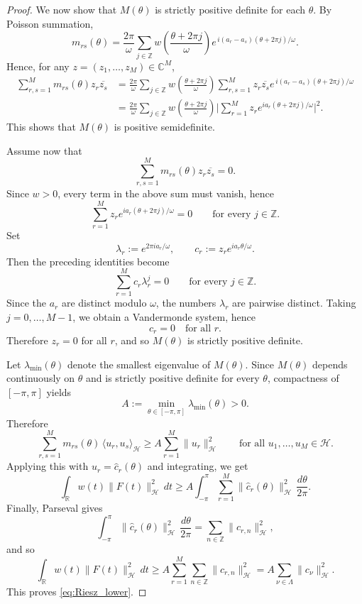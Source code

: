\documentclass[10pt,a4paper]{amsart}
\begin{document}
\begin{proof}
We now show that $M(\theta)$ is strictly positive definite for each $\theta$.
By Poisson summation,
\[
m_{rs}(\theta)
=
\frac{2\pi}{\omega}\sum_{j\in\mathbb Z}
w\!\left(\frac{\theta+2\pi j}{\omega}\right)
e^{\,i(a_r-a_s)(\theta+2\pi j)/\omega}.
\]
Hence, for any $z=(z_1,\dots,z_M)\in\mathbb C^M$,
\begin{align*}
\sum_{r,s=1}^M m_{rs}(\theta) z_r\overline{z_s}
&=
\frac{2\pi}{\omega}\sum_{j\in\mathbb Z}
w\!\left(\frac{\theta+2\pi j}{\omega}\right)
\sum_{r,s=1}^M
z_r\overline{z_s}
e^{\,i(a_r-a_s)(\theta+2\pi j)/\omega} \\
&=
\frac{2\pi}{\omega}\sum_{j\in\mathbb Z}
w\!\left(\frac{\theta+2\pi j}{\omega}\right)
\Big|\sum_{r=1}^M z_r e^{ia_r(\theta+2\pi j)/\omega}\Big|^2.
\end{align*}
This shows that $M(\theta)$ is positive semidefinite.

Assume now that
\[
\sum_{r,s=1}^M m_{rs}(\theta) z_r\overline{z_s}=0.
\]
Since $w>0$, every term in the above sum must vanish, hence
\[
\sum_{r=1}^M z_r e^{ia_r(\theta+2\pi j)/\omega}=0
\qquad\text{for every }j\in\mathbb Z.
\]
Set
\[
\lambda_r:=e^{2\pi i a_r/\omega},
\qquad
c_r:=z_r e^{ia_r\theta/\omega}.
\]
Then the preceding identities become
\[
\sum_{r=1}^M c_r \lambda_r^j = 0
\qquad\text{for every }j\in\mathbb Z.
\]
Since the $a_r$ are distinct modulo $\omega$, the numbers $\lambda_r$ are pairwise distinct. Taking $j=0,\dots,M-1$, we obtain a Vandermonde system, hence
\[
c_r=0 \quad\text{for all }r.
\]
Therefore $z_r=0$ for all $r$, and so $M(\theta)$ is strictly positive definite.

Let $\lambda_{\min}(\theta)$ denote the smallest eigenvalue of $M(\theta)$. Since $M(\theta)$ depends continuously on $\theta$ and is strictly positive definite for every $\theta$, compactness of $[-\pi,\pi]$ yields
\[
A:=\min_{\theta\in[-\pi,\pi]} \lambda_{\min}(\theta)>0.
\]
Therefore
\[
\sum_{r,s=1}^M
m_{rs}(\theta)\,
\langle u_r,u_s\rangle_{\mathcal H}
\ge
A\sum_{r=1}^M \|u_r\|_{\mathcal H}^2
\qquad
\text{for all }u_1,\dots,u_M\in\mathcal H.
\]
Applying this with $u_r=\widehat c_r(\theta)$ and integrating, we get
\[
\int_{\mathbb R} w(t)\|F(t)\|_{\mathcal H}^2\,dt
\ge
A\int_{-\pi}^{\pi}\sum_{r=1}^M \|\widehat c_r(\theta)\|_{\mathcal H}^2\,\frac{d\theta}{2\pi}.
\]
Finally, Parseval gives
\[
\int_{-\pi}^{\pi}\|\widehat c_r(\theta)\|_{\mathcal H}^2\,\frac{d\theta}{2\pi}
=
\sum_{n\in\mathbb Z}\|c_{r,n}\|_{\mathcal H}^2,
\]
and so
\[
\int_{\mathbb R} w(t)\|F(t)\|_{\mathcal H}^2\,dt
\ge
A\sum_{r=1}^M\sum_{n\in\mathbb Z}\|c_{r,n}\|_{\mathcal H}^2
=
A\sum_{\nu\in\Lambda}\|c_\nu\|_{\mathcal H}^2.
\]
This proves \eqref{eq:Riesz_lower}.
\end{proof}
\end{document}
